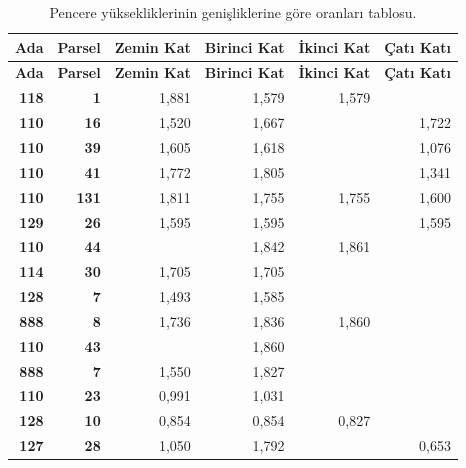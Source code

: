 \documentclass[12pt,turkish,a4paperpaper,]{report}
\begin{document}
\begin{longtable}[]{@{}rrrrrr@{}}
\caption{Pencere yüksekliklerinin genişliklerine göre oranları tablosu.
\label{POran}}\tabularnewline
\toprule
\textbf{Ada} & \textbf{Parsel} & \textbf{Zemin Kat} & \textbf{Birinci
Kat} & \textbf{İkinci Kat} & \textbf{Çatı Katı}\tabularnewline
\midrule
\endfirsthead
\toprule
\textbf{Ada} & \textbf{Parsel} & \textbf{Zemin Kat} & \textbf{Birinci
Kat} & \textbf{İkinci Kat} & \textbf{Çatı Katı}\tabularnewline
\midrule
\endhead
\textbf{118} & \textbf{1} & 1,881 & 1,579 & 1,579 &\tabularnewline
\textbf{110} & \textbf{16} & 1,520 & 1,667 & & 1,722\tabularnewline
\textbf{110} & \textbf{39} & 1,605 & 1,618 & & 1,076\tabularnewline
\textbf{110} & \textbf{41} & 1,772 & 1,805 & & 1,341\tabularnewline
\textbf{110} & \textbf{131} & 1,811 & 1,755 & 1,755 &
1,600\tabularnewline
\textbf{129} & \textbf{26} & 1,595 & 1,595 & & 1,595\tabularnewline
\textbf{110} & \textbf{44} & & 1,842 & 1,861 &\tabularnewline
\textbf{114} & \textbf{30} & 1,705 & 1,705 & &\tabularnewline
\textbf{128} & \textbf{7} & 1,493 & 1,585 & &\tabularnewline
\textbf{888} & \textbf{8} & 1,736 & 1,836 & 1,860 &\tabularnewline
\textbf{110} & \textbf{43} & & 1,860 & &\tabularnewline
\textbf{888} & \textbf{7} & 1,550 & 1,827 & &\tabularnewline
\textbf{110} & \textbf{23} & 0,991 & 1,031 & &\tabularnewline
\textbf{128} & \textbf{10} & 0,854 & 0,854 & 0,827 &\tabularnewline
\textbf{127} & \textbf{28} & 1,050 & 1,792 & & 0,653\tabularnewline
\bottomrule
\end{longtable}
\end{document}
